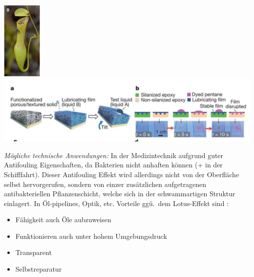 \begin{center}
    \includegraphics[width=2cm]{lec4/figures/ameise.png}
    \hfill
    \includegraphics[width=14cm]{lec4/figures/slips.png}
\end{center}

\textit{Mögliche technische Anwendungen:} In der Medizintechnik aufgrund guter Antifouling Eigenschaften, da Bakterien nicht anhaften können (+ in der Schifffahrt). Dieser Antifouling Effekt wird allerdings nicht von der Oberfläche selbst hervorgerufen, sondern von einzer zusätzlichen aufgetragenen antibakteriellen Pflanzenschicht, welche sich in der schwammartigen Struktur einlagert. In Öl-pipelines, Optik, etc. Vorteile ggü.\ dem Lotus-Effekt sind \dangersign:

\begin{itemize}
    \item Fähigkeit auch Öle aubzuweisen
    \item Funktionieren auch unter hohem Umgebungsdruck
    \item Transparent
    \item Selbstreparatur
\end{itemize}